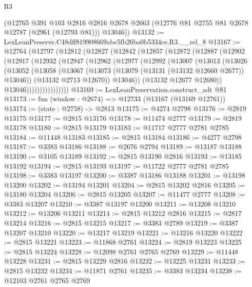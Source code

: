 \begin{lexlean}{R3}
\begin{coremodule}
      (@12765
        @391
        @103
        @2816
        @2816
        @2678
        @2663
        (@12776 @81 @2755 @81 @2678 @12787 (@2961 (@12793 @81)))
        @13046))
@13132 := LexLeanPreserve.C48dff819908669abc5fb26ba0b5334ce.R3.__rel_8
@13167 := @12764
    (@12797
      (@12812
        (@12827
          (@12842
            (@12857
              (@12872
                (@12887
                  (@12902
                    (@12917
                      (@12932
                        (@12947
                          (@12962
                            (@12977
                              (@12992
                                (@13007
                                  (@13013
                                    (@13026
                                      (@13052
                                        (@13058
                                          (@13067
                                            (@13073 (@13079 (@13131 (@13132 @12660 @2677)) @13046))
                                            (@13132 @2713 @12670))
                                          @13046))
                                      (@13132 @12677 @12680))
                                    @13046))))))))))))))))
@13169 := LexLeanPreservation.construct_adt @81
@13173 := fun (window : @2674) => @12733 (@13167 (@13169 @12761))
@13174 := (state : @2758) -> @2813
@13175 := @4274 @2798
@13176 := @2819 @13175
@13177 := @2815 @13176
@13178 := @11474 @2777
@13179 := @2819 @13178
@13180 := @2815 @13179
@13183 := @11717 @2777 @2781 @2785
@13184 := @11448 @13183
@13185 := @2815 @13184
@13186 := @4277 @2798
@13187 := @3383 @13186
@13188 := @2676 @2794
@13189 := @13187 @13188
@13190 := @3105 @13189
@13192 := @2815 @13190 @2816
@13193 := @13185 @13192
@13194 := @2815 @13193
@13197 := @11722 @2777 @2781 @2785
@13198 := @3383 @13197
@13200 := @3387 @13186 @13188
@13201 := @13198 @13200
@13202 := @13194 @13201
@13204 := @2815 @13202 @2816
@13205 := @13180 @13204
@13206 := @2815 @13205
@13207 := @11477 @2777
@13208 := @3383 @13207
@13210 := @3387 @13197 @13200
@13211 := @13208 @13210
@13212 := @13206 @13211
@13214 := @2815 @13212 @2816
@13215 := @2817 @13214
@13216 := @2815 @13215
@13217 := @3383 @2789
@13219 := @3387 @13207 @13210
@13220 := @13217 @13219
@13221 := @13216 @13220
@13222 := @2815 @13221
@13223 := @11868 @2761
@13224 := @2819 @13223
@13225 := @2815 @13224
@13228 := @12098 @2761 @2765 @2769
@13229 := @11448 @13228
@13231 := @2815 @13229 @2816
@13232 := @13225 @13231
@13233 := @2815 @13232
@13234 := @11871 @2761
@13235 := @3383 @13234
@13238 := @12103 @2761 @2765 @2769

\end{coremodule}
\end{lexlean}
